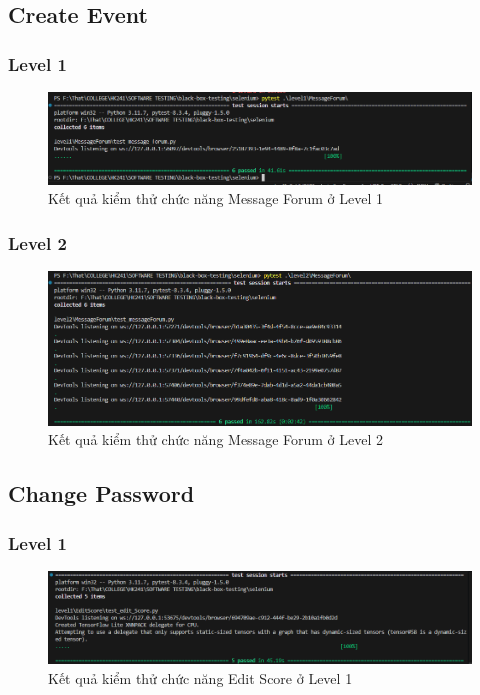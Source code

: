 \subsection{Create Event}
\subsubsection{Level 1}
\begin{figure}[H]
    \centering
    \includegraphics[width=0.8\linewidth]{image/message-forum-lv1.png}
    \caption{Kết quả kiểm thử chức năng Message Forum ở Level 1}
    \label{fig:enter-label}
\end{figure}
\subsubsection{Level 2}
\begin{figure}[H]
    \centering
    \includegraphics[width=0.8\linewidth]{image/message-forum-lv2.png}
    \caption{Kết quả kiểm thử chức năng Message Forum ở Level 2}
    \label{fig:enter-label}
\end{figure}
\subsection{Change Password}
\subsubsection{Level 1}
\begin{figure}[H]
    \centering
    \includegraphics[width=0.8\linewidth]{image/edit-score-lv1.png}
    \caption{Kết quả kiểm thử chức năng Edit Score ở Level 1}
    \label{fig:enter-label}
\end{figure}
